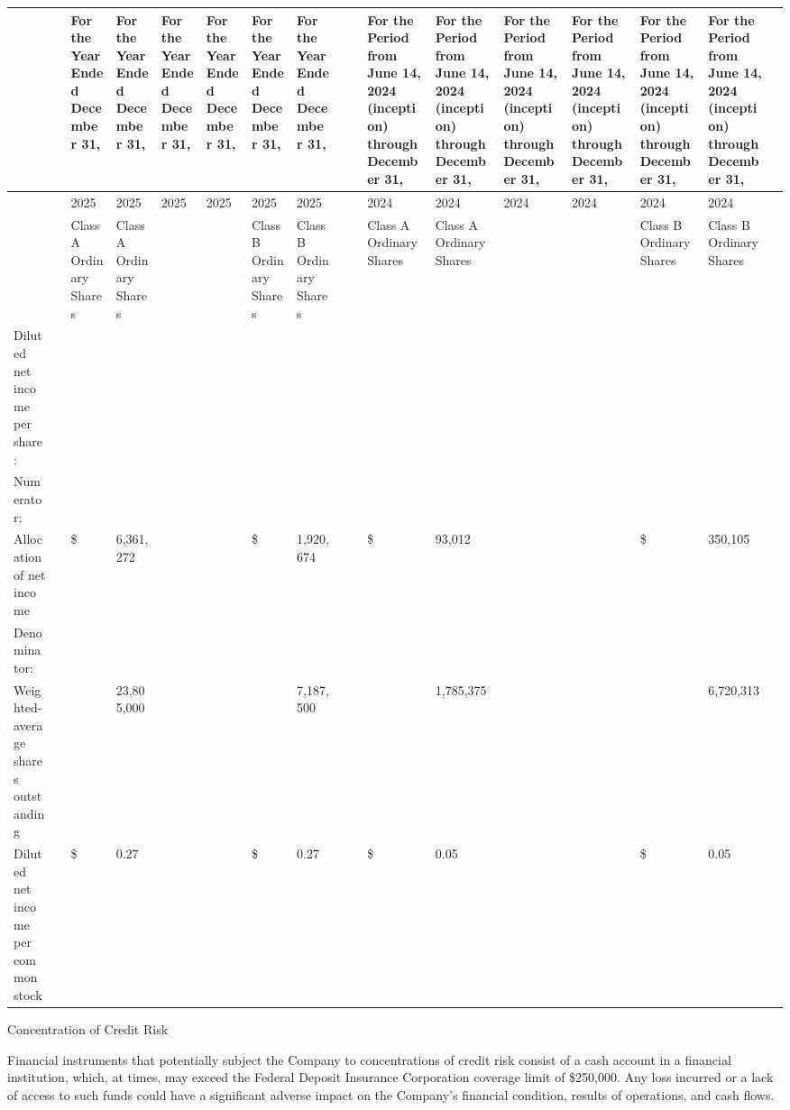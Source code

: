 \documentclass[11pt,a4paper]{article}
\begin{document}
\begin{table}[h]
\begin{tabular}{|l|l|l|l|l|l|l|l|l|l|l|l|l|l|l|l|l|}
\hline
 &  & For the Year Ended December 31, & For the Year Ended December 31, & For the Year Ended December 31, & For the Year Ended December 31, & For the Year Ended December 31, & For the Year Ended December 31, &  &  & For the Period from June 14, 2024 (inception) through December 31, & For the Period from June 14, 2024 (inception) through December 31, & For the Period from June 14, 2024 (inception) through December 31, & For the Period from June 14, 2024 (inception) through December 31, & For the Period from June 14, 2024 (inception) through December 31, & For the Period from June 14, 2024 (inception) through December 31, &  \\ \hline
 &  & 2025 & 2025 & 2025 & 2025 & 2025 & 2025 &  &  & 2024 & 2024 & 2024 & 2024 & 2024 & 2024 &  \\ \hline
 &  & Class A Ordinary Shares & Class A Ordinary Shares &  &  & Class B Ordinary Shares & Class B Ordinary Shares &  &  & Class A Ordinary Shares & Class A Ordinary Shares &  &  & Class B Ordinary Shares & Class B Ordinary Shares &  \\ \hline
Diluted net income per share: &  &  &  &  &  &  &  &  &  &  &  &  &  &  &  &  \\ \hline
Numerator: &  &  &  &  &  &  &  &  &  &  &  &  &  &  &  &  \\ \hline
Allocation of net income &  & \$ & 6,361,272 &  &  & \$ & 1,920,674 &  &  & \$ & 93,012 &  &  & \$ & 350,105 &  \\ \hline
Denominator: &  &  &  &  &  &  &  &  &  &  &  &  &  &  &  &  \\ \hline
Weighted-average shares outstanding &  &  & 23,805,000 &  &  &  & 7,187,500 &  &  &  & 1,785,375 &  &  &  & 6,720,313 &  \\ \hline
Diluted net income per common stock &  & \$ & 0.27 &  &  & \$ & 0.27 &  &  & \$ & 0.05 &  &  & \$ & 0.05 &  \\ \hline
\end{tabular}
\end{table}

Concentration of Credit Risk

Financial instruments that potentially subject the Company to concentrations of credit risk consist of a cash account in a financial institution, which, at times, may exceed the Federal Deposit Insurance Corporation coverage limit of \$250,000. Any loss incurred or a lack of access to such funds could have a significant adverse impact on the Company's financial condition, results of operations, and cash flows.
\end{document}
